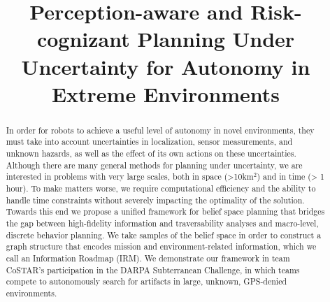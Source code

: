 \documentclass[letterpaper, 10 pt, conference]{ieeeconf}  %
\title{\LARGE \bf
Perception-aware and Risk-cognizant Planning Under Uncertainty for Autonomy in Extreme Environments
}
\newcommand{\ph}[1]{{\textbf{#1}:}} %
\begin{document}
\maketitle
\pagestyle{plain}

\begin{abstract}
In order for robots to achieve a useful level of autonomy in novel environments, they must take into account uncertainties in localization, sensor measurements, and unknown hazards, as well as the effect of its own actions on these uncertainties.  Although there are many general methods for planning under uncertainty, we are interested in problems with very large scales, both in space (>10km$^2$) and in time (> 1 hour).  To make matters worse, we require computational efficiency and the ability to handle time constraints without severely impacting the optimality of the solution.  Towards this end we propose a unified framework for belief space planning that bridges the gap between high-fidelity information and traversability analyses and macro-level, discrete behavior planning.  We take samples of the belief space in order to construct a graph structure that encodes mission and environment-related information, which we call an Information Roadmap (IRM).  We demonstrate our framework in team CoSTAR's participation in the DARPA Subterranean Challenge, in which teams compete to autonomously search for artifacts in large, unknown, GPS-denied environments. 
\end{abstract}





\end{document}
